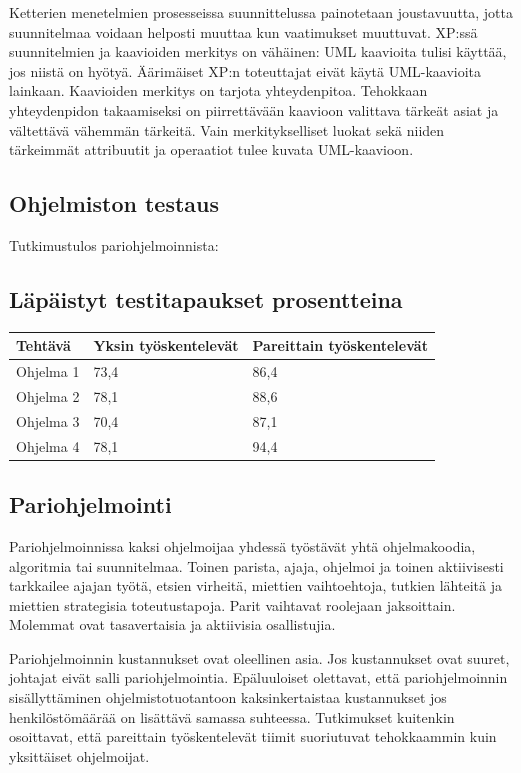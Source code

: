 \documentclass[finnish]{tktltiki2}
\theoremstyle{definition}
\theoremstyle{remark}
\begin{document}
Ketterien menetelmien prosesseissa suunnittelussa painotetaan joustavuutta, jotta suunnitelmaa voidaan helposti muuttaa kun vaatimukset muuttuvat. XP:ssä suunnitelmien ja kaavioiden merkitys on vähäinen: UML kaavioita tulisi käyttää, jos niistä on hyötyä. Äärimäiset XP:n toteuttajat eivät käytä UML-kaavioita lainkaan\cite{FOW01b}. Kaavioiden merkitys on tarjota yhteydenpitoa. Tehokkaan yhteydenpidon takaamiseksi on piirrettävään kaavioon valittava tärkeät asiat ja vältettävä vähemmän tärkeitä. Vain merkitykselliset luokat sekä niiden tärkeimmät attribuutit ja operaatiot tulee kuvata UML-kaavioon\cite{FOW01b}.

\subsection{Ohjelmiston testaus}


Tutkimustulos pariohjelmoinnista\cite{WIL00}:

\subsection*{Läpäistyt testitapaukset prosentteina}
\begin{center}
    \begin{tabular}{ | l | l | p{5cm} |}
    \hline
    Tehtävä & Yksin työskentelevät & Pareittain työskentelevät \\ \hline
    Ohjelma 1 & 73,4 & 86,4 \\ \hline
    Ohjelma 2 & 78,1 & 88,6 \\ \hline
    Ohjelma 3 & 70,4 & 87,1 \\ \hline
    Ohjelma 4 & 78,1 & 94,4 \\ \hline
    \end{tabular}
\end{center}

\subsection{Pariohjelmointi}

Pariohjelmoinnissa kaksi ohjelmoijaa yhdessä työstävät yhtä ohjelmakoodia, algoritmia tai suunnitelmaa. Toinen parista, ajaja, ohjelmoi ja toinen aktiivisesti tarkkailee ajajan työtä, etsien virheitä, miettien vaihtoehtoja, tutkien lähteitä ja miettien strategisia toteutustapoja. Parit vaihtavat roolejaan jaksoittain. Molemmat ovat tasavertaisia ja aktiivisia osallistujia\cite{WIL00}.

Pariohjelmoinnin kustannukset ovat oleellinen asia. Jos kustannukset ovat suuret, johtajat eivät salli pariohjelmointia. Epäluuloiset olettavat, että pariohjelmoinnin sisällyttäminen ohjelmistotuotantoon kaksinkertaistaa kustannukset jos henkilöstömäärää on lisättävä samassa suhteessa. Tutkimukset kuitenkin osoittavat, että pareittain työskentelevät tiimit suoriutuvat tehokkaammin kuin yksittäiset ohjelmoijat\cite{NOS98}\cite{WIL00}.
\end{document}
